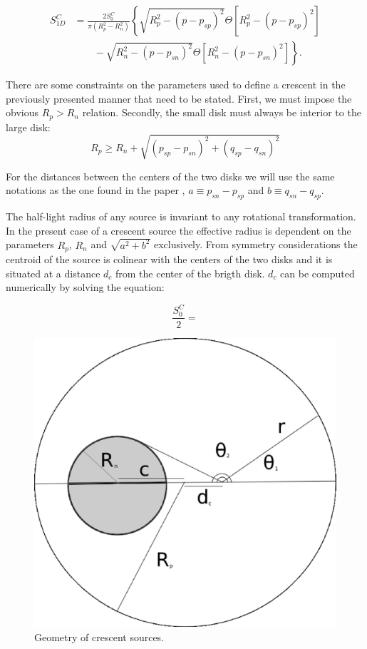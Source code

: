 \begin{align}
 S_{1D}^C &= \frac{2 S_0^C}{\pi \left(R_p^2-R_n^2 \right)} \left\{ \sqrt{R_p^2 - (p-p_{sp})^2}  \Theta \left[ R_p^2 - \left( p-p_{sp} \right)^2 \right] \right.\nonumber\\
 &\qquad \left. {} - \sqrt{R_n^2 - (p-p_{sn})^2 } \Theta \left[ R_n^2 - \left( p-p_{sn} \right)^2 \right] \right\}.
\end{align}


There are some constraints on the parameters used to define a crescent in the previously presented manner that need to be stated. First, we must impose the obvious $R_p > R_n$ relation. Secondly, 
the small disk must always be interior to the large disk:
\begin{equation}
 R_p \ge R_n + \sqrt{\left(p_{sp} - p_{sn} \right)^2 + \left(q_{sp} - q_{sn} \right)^2}
\end{equation}

For the distances between the centers of the two disks we will use the same notations as the one found in the paper \citep{2013MNRAS.434..765K}, $a \equiv p_{sn} - p_{sp}$ and $b \equiv q_{sn} - q_{sp}$.

The half-light radius of any source is invariant to any rotational transformation. In the present case of a crescent source the effective radius is dependent on the parameters $R_p$, $R_n$ and $\sqrt{a^2+b^2}$ exclusively. From symmetry considerations the centroid of the source is colinear with the centers of the two disks and it is situated at a distance $d_c$ from the center of the brigth disk. $d_c$ can be computed numerically by solving the equation:

\begin{equation}
\frac{S_0^C}{2} =  
\end{equation}   


\begin{figure}
\includegraphics[width = .8\textwidth]{plots/figure_rhalf.eps}
\caption{\label{fig:geom_crescent} Geometry of crescent sources.}
\end{figure}





